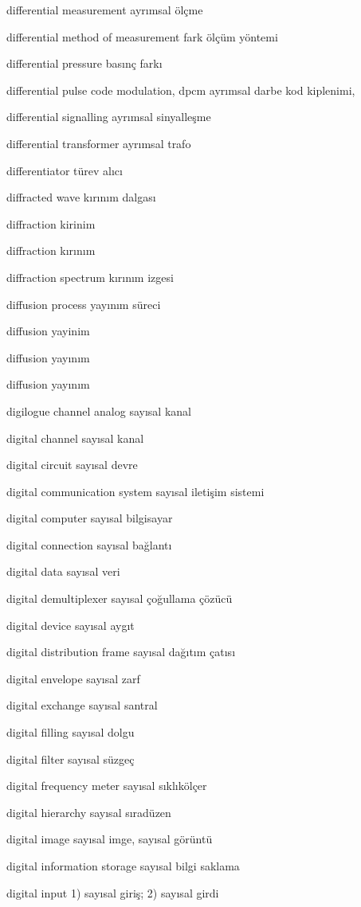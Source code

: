 \documentclass[12pt,fleqn]{article}\usepackage{../../common}
\begin{document}
differential measurement ayrımsal ölçme

differential method of measurement fark ölçüm yöntemi

differential pressure basınç farkı

differential pulse code modulation, dpcm ayrımsal darbe kod kiplenimi,

differential signalling ayrımsal sinyalleşme

differential transformer ayrımsal trafo

differentiator türev alıcı

diffracted wave kırınım dalgası

diffraction kirinim

diffraction kırınım

diffraction spectrum kırınım izgesi

diffusion process yayınım süreci

diffusion yayinim

diffusion yayınım

diffusion yayınım

digilogue channel analog sayısal kanal

digital channel sayısal kanal

digital circuit sayısal devre

digital communication system sayısal iletişim sistemi

digital computer sayısal bilgisayar

digital connection sayısal bağlantı

digital data sayısal veri

digital demultiplexer sayısal çoğullama çözücü

digital device sayısal aygıt

digital distribution frame sayısal dağıtım çatısı

digital envelope sayısal zarf

digital exchange sayısal santral

digital filling sayısal dolgu

digital filter sayısal süzgeç

digital frequency meter sayısal sıklıkölçer

digital hierarchy sayısal sıradüzen

digital image sayısal imge, sayısal görüntü

digital information storage sayısal bilgi saklama

digital input 1) sayısal giriş; 2) sayısal girdi
\end{document}
